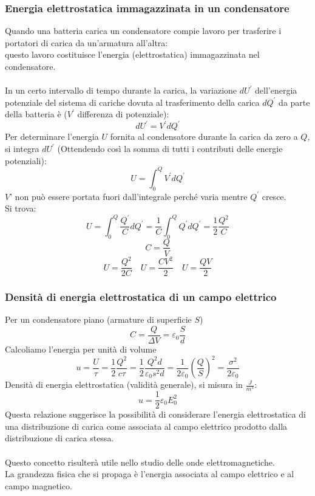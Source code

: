 \documentclass[../main.tex]{subfiles}
\begin{document}
	\subsubsection{Energia elettrostatica immagazzinata in un condensatore}
	Quando una batteria carica un condensatore compie lavoro per trasferire i portatori di carica da un’armatura all’altra:\\
	questo lavoro costituisce l’energia (elettrostatica) immagazzinata nel condensatore.\\\\
	In un certo intervallo di tempo durante la carica, la variazione $dU^\prime$ dell’energia potenziale del sistema di cariche dovuta al trasferimento della carica $dQ^\prime$ da parte della batteria è ($V^\prime$ differenza di potenziale):
	$$ dU^\prime = V^\prime dQ^\prime $$
	Per determinare l’energia $U$ fornita al condensatore durante la carica da zero a $Q$, si integra $dU^\prime$ (Ottendendo così la somma di tutti i contributi delle energie potenziali):
	$$ U = \int_{0}^{Q} V^\prime dQ^\prime $$
	$V’$ non può essere portata fuori dall’integrale perché varia mentre $Q^\prime$ cresce. \\
	Si trova:
	$$ U = \int_{0}^{Q} \frac{Q^\prime}{C} dQ^\prime = \frac{1}{C} \int_{0}^{Q} Q^\prime dQ^\prime = \frac{1}{2} \frac{Q^2}{C} $$
	$$ C = \frac{Q}{V} $$
	$$ U = \frac{Q^2}{2C} \quad U = \frac{CV^2}{2} \quad U = \frac{QV}{2} $$
	\subsubsection{Densità di energia elettrostatica di un campo elettrico}
	Per un condensatore piano (armature di superficie $S$)
	$$ C = \frac{Q}{\Delta V} = \varepsilon_0 \frac{S}{d} $$
	Calcoliamo l’energia per unità di volume
	$$ u = \frac{U}{\tau} = \frac{1}{2} \frac{Q^2}{c \tau} = \frac{1}{2} \frac{Q^2 d}{\varepsilon_0 s^2 d} = \frac{1}{2 \varepsilon_0} \left(\frac{Q}{S}\right)^2 = \frac{\sigma^2}{2 \varepsilon_0} $$
	Densità di energia elettrostatica (validità generale), si misura in $\frac{J}{m^3}$:
	$$ u = \frac{1}{2} \varepsilon_0 E_0^2 $$
	Questa relazione suggerisce la possibilità di considerare l’energia elettrostatica di una distribuzione di carica come associata al campo elettrico prodotto dalla distribuzione di carica stessa.\\\\
	Questo concetto risulterà utile nello studio delle onde elettromagnetiche. \\
	La grandezza fisica che si propaga è l’energia associata al campo elettrico e al campo magnetico.
\end{document}
